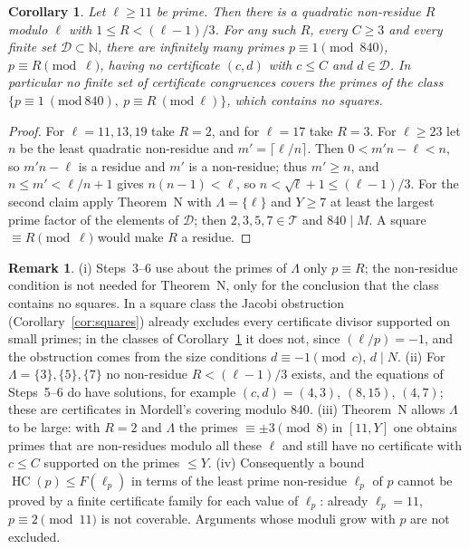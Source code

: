 \documentclass[11pt,reqno]{amsart}
\newtheorem{corollary}[theorem]{Corollary}
\theoremstyle{definition}
\newtheorem{remark}[theorem]{Remark}
\newcommand{\N}{\mathbb N}
\newcommand{\cT}{\mathcal T}
\newcommand{\HC}{\operatorname{HC}}
\begin{document}
\begin{corollary}\label{cor:nonsquare}
Let $\ell\ge11$ be prime.  Then there is a quadratic non-residue $R$
modulo $\ell$ with $1\le R<(\ell-1)/3$.  For any such $R$, every $C\ge3$
and every finite set $\mathcal D\subset\N$, there are infinitely many
primes $p\equiv1\pmod{840}$, $p\equiv R\pmod\ell$, having no certificate
$(c,d)$ with $c\le C$ and $d\in\mathcal D$.  In particular no finite set of
certificate congruences covers the primes of the class
$\{p\equiv1\ (\mathrm{mod}\ 840),\ p\equiv R\ (\mathrm{mod}\ \ell)\}$,
which contains no squares.
\end{corollary}

\begin{proof}
For $\ell=11,13,19$ take $R=2$, and for $\ell=17$ take $R=3$.  For
$\ell\ge23$ let $n$ be the least quadratic non-residue and
$m'=\lceil\ell/n\rceil$.  Then $0<m'n-\ell<n$, so $m'n-\ell$ is a residue
and $m'$ is a non-residue; thus $m'\ge n$, and $n\le m'<\ell/n+1$ gives
$n(n-1)<\ell$, so $n<\sqrt\ell+1\le(\ell-1)/3$.  For the second claim
apply Theorem~N with $\Lambda=\{\ell\}$ and $Y\ge7$ at least the largest
prime factor of the elements of $\mathcal D$; then $2,3,5,7\in\cT$ and
$840\mid M$.  A square $\equiv R\pmod\ell$ would make $R$ a residue.
\end{proof}

\begin{remark}
(i) Steps~3--6 use about the primes of $\Lambda$ only $p\equiv R$; the
non-residue condition is not needed for Theorem~N, only for the conclusion
that the class contains no squares.  In a square class the Jacobi
obstruction (Corollary~\ref{cor:squares}) already excludes every
certificate divisor supported on small primes; in the classes of
Corollary~\ref{cor:nonsquare} it does not, since $(\ell/p)=-1$, and the
obstruction comes from the size conditions $d\equiv-1\pmod c$, $d\mid N$.
(ii) For $\Lambda=\{3\},\{5\},\{7\}$ no non-residue $R<(\ell-1)/3$ exists, and
the equations of Steps~5--6 do have solutions, for example $(c,d)=(4,3)$,
$(8,15)$, $(4,7)$; these are certificates in Mordell's covering modulo
$840$.  (iii) Theorem~N allows $\Lambda$ to be large: with $R=2$ and
$\Lambda$ the primes $\equiv\pm3\pmod 8$ in $[11,Y]$ one obtains primes
that are non-residues modulo all these $\ell$ and still have no
certificate with $c\le C$ supported on the primes $\le Y$.
(iv) Consequently a bound $\HC(p)\le F(\ell_p)$ in terms of the least
prime non-residue $\ell_p$ of $p$ cannot be proved by a finite certificate
family for each value of $\ell_p$: already $\ell_p=11$, $p\equiv2\pmod{11}$
is not coverable.  Arguments whose moduli grow with $p$ are not excluded.
\end{remark}
\end{document}

